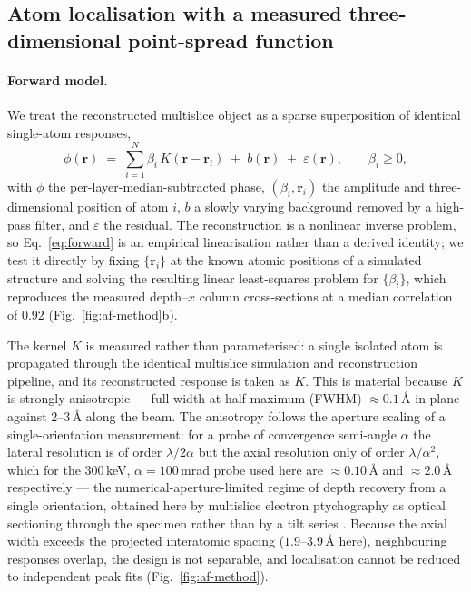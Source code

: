 \subsection{Atom localisation with a measured three-dimensional point-spread function}
\label{sec:atomfind}

\paragraph{Forward model.}
We treat the reconstructed multislice object as a sparse superposition of identical
single-atom responses,
\begin{equation}
  \phi(\mathbf{r}) \;=\; \sum_{i=1}^{N} \beta_i\, K(\mathbf{r}-\mathbf{r}_i)
  \;+\; b(\mathbf{r}) \;+\; \varepsilon(\mathbf{r}),
  \qquad \beta_i \ge 0,
  \label{eq:forward}
\end{equation}
with $\phi$ the per-layer-median-subtracted phase, $(\beta_i,\mathbf{r}_i)$ the amplitude
and three-dimensional position of atom $i$, $b$ a slowly varying background removed by a
high-pass filter, and $\varepsilon$ the residual. The
reconstruction is a nonlinear inverse problem, so Eq.~\eqref{eq:forward} is an empirical
linearisation rather than a derived identity; we test it directly by fixing
$\{\mathbf{r}_i\}$ at the known atomic positions of a simulated structure and solving the
resulting linear least-squares problem for $\{\beta_i\}$, which reproduces the measured
depth--$x$ column cross-sections at a median correlation of $0.92$
(Fig.~\ref{fig:af-method}b).

The kernel $K$ is measured rather than parameterised: a single isolated atom is propagated
through the identical multislice simulation and reconstruction pipeline, and its
reconstructed response is taken as $K$. This is material because $K$ is strongly
anisotropic --- full width at half maximum (FWHM) $\approx 0.1$\,\AA{} in-plane against
$2$--$3$\,\AA{} along the beam. The anisotropy follows the aperture scaling of a
single-orientation measurement: for a probe of convergence semi-angle $\alpha$ the lateral
resolution is of order $\lambda/2\alpha$ but the axial resolution only of order
$\lambda/\alpha^2$, which for the $300$\,keV, $\alpha=100$\,mrad probe used here are
$\approx 0.10$\,\AA{} and $\approx 2.0$\,\AA{} respectively --- the numerical-aperture-limited
regime of depth recovery from a single orientation, obtained here by multislice electron
ptychography as optical sectioning through the specimen rather than by a tilt series
\citep{Chen2021}. Because the axial
width exceeds the projected interatomic spacing ($1.9$--$3.9$\,\AA{} here), neighbouring
responses overlap, the design is not separable, and localisation cannot be reduced to
independent peak fits (Fig.~\ref{fig:af-method}).

